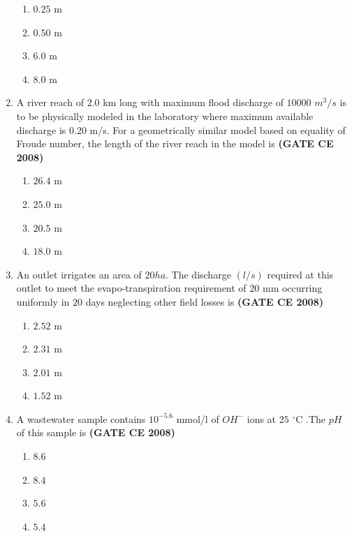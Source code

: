 \documentclass[journal]{IEEEtran}
\begin{document}
\begin{enumerate}
\begin{multicols}{2}
\begin{enumerate}
\item $0.25$ m 
\item $0.50$ m
\item $6.0$ m 
\item $8.0$ m 
\end{enumerate}     
\end{multicols}

\item A river reach of $2.0$ km long with maximum flood discharge of $10000$ $m^{3}/s$ is to be physically modeled in the laboratory where maximum available discharge is 0.20 m/s. For a geometrically similar model based on equality of Froude number, the length of the river reach  in the model is \textbf{(GATE CE 2008)}

\begin{multicols}{2}

\begin{enumerate}
\item $26.4$ m 
\item $25.0$ m
\item $20.5$ m 
\item $18.0$ m 
\end{enumerate}     
\end{multicols}

\item An outlet irrigates an area of $20  ha$. The discharge $(l/s)$ required at this outlet to meet the evapo-transpiration requirement of 20 mm occurring uniformly in $20$ days neglecting other field losses is \textbf{(GATE CE 2008)}

\begin{multicols}{2}

\begin{enumerate}
\item $2.52$ m 
\item $2.31$ m
\item $2.01$ m 
\item $1.52$ m 
\end{enumerate}     
\end{multicols}

\item A wastewater sample contains $10^{-5.6}$ mmol/l of $OH^{-}$ ions at $25$ $^\circ\text{C}$ .The $pH$ of this sample is \textbf{(GATE CE 2008)}

\begin{multicols}{2}

\begin{enumerate}
\item $8.6$ 
\item $8.4$
\item $5.6$ 
\item $5.4$ 
\end{enumerate}     
\end{multicols}


\end{enumerate}
\end{document}
